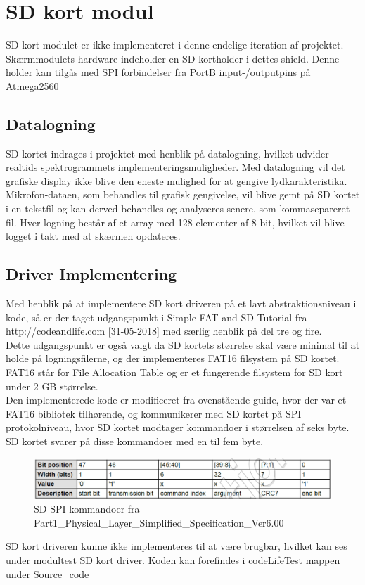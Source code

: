 \section{SD kort modul}

SD kort modulet er ikke implementeret i denne endelige iteration af projektet.\\


Skærmmodulets hardware indeholder en SD kortholder i dettes shield. Denne holder kan tilgås med SPI forbindelser fra PortB input-/outputpins på Atmega2560 

\subsection{Datalogning}
 
SD kortet indrages i projektet med henblik på datalogning, hvilket udvider realtids spektrogrammets implementeringsmuligheder. Med datalogning vil det grafiske display ikke blive den eneste mulighed for at gengive lydkarakteristika. Mikrofon-dataen, som behandles til grafisk gengivelse, vil blive gemt på SD kortet i en tekstfil og kan derved behandles og analyseres senere, som kommasepareret fil. Hver logning består af et array med 128 elementer af 8 bit, hvilket vil blive logget i takt med at skærmen opdateres.

\subsection{Driver Implementering}

Med henblik på at implementere SD kort driveren på et lavt abstraktionsniveau i kode, så er der taget udgangspunkt i Simple FAT and SD Tutorial fra http://codeandlife.com [31-05-2018] med særlig henblik på del tre og fire.\\
Dette udgangspunkt er også valgt da SD kortets størrelse skal være minimal til at holde på logningsfilerne, og der implementeres FAT16 filsystem på SD kortet. FAT16 står for File Allocation Table og er et fungerende filsystem for SD kort under 2 GB størrelse.\\
Den implementerede kode er modificeret fra ovenstående guide, hvor der var et FAT16 bibliotek tilhørende, og kommunikerer med SD kortet på SPI protokolniveau, hvor SD kortet modtager kommandoer i størrelsen af seks byte. SD kortet svarer på disse kommandoer med en til fem byte. 

\begin{figure}[H]
	\center
	\includegraphics[width=1.0\textwidth]{Figur/SDcmd.png}
	\caption{SD SPI kommandoer fra Part1\_Physical\_Layer\_Simplified\_Specification\_Ver6.00}
	\label{fig:SDcmd}
\end{figure}

SD kort driveren kunne ikke implementeres til at være brugbar, hvilket kan ses under modultest SD kort driver. Koden kan forefindes i codeLifeTest mappen under Source\_code

